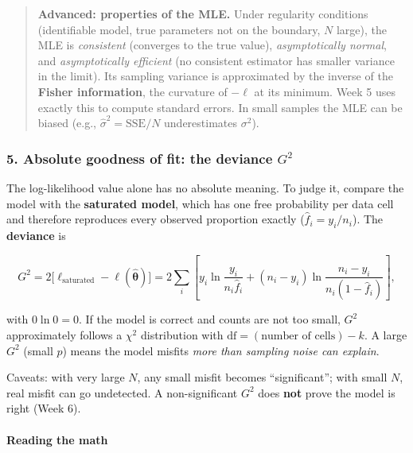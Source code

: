 \begin{quote}
\textbf{Advanced: properties of the MLE.} Under regularity conditions
(identifiable model, true parameters not on the boundary, \(N\) large),
the MLE is \emph{consistent} (converges to the true value),
\emph{asymptotically normal}, and \emph{asymptotically efficient} (no
consistent estimator has smaller variance in the limit). Its sampling
variance is approximated by the inverse of the \textbf{Fisher
information}, the curvature of \(-\ell\) at its minimum. Week 5 uses
exactly this to compute standard errors. In small samples the MLE can be
biased (e.g., \(\hat\sigma^2 = \mathrm{SSE}/N\) underestimates
\(\sigma^2\)).
\end{quote}

\subsubsection{\texorpdfstring{5. Absolute goodness of fit: the deviance
\(G^2\)}{5. Absolute goodness of fit: the deviance G\^{}2}}

The log-likelihood value alone has no absolute meaning. To judge it,
compare the model with the \textbf{saturated model}, which has one free
probability per data cell and therefore reproduces every observed
proportion exactly (\(\hat f_i = y_i/n_i\)). The \textbf{deviance} is

\[
G^2 = 2\big[\ell_{\text{saturated}} - \ell(\hat{\boldsymbol\theta})\big]
= 2\sum_i \left[y_i \ln\frac{y_i}{n_i \hat f_i} + (n_i - y_i)\ln\frac{n_i - y_i}{n_i(1-\hat f_i)}\right],
\]

with \(0 \ln 0 = 0\). If the model is correct and counts are not too
small, \(G^2\) approximately follows a \(\chi^2\) distribution with
\(\text{df} = (\text{number of cells}) - k\). A large \(G^2\) (small
\(p\)) means the model misfits \emph{more than sampling noise can
explain}.

Caveats: with very large \(N\), any small misfit becomes
``significant''; with small \(N\), real misfit can go undetected. A
non-significant \(G^2\) does \textbf{not} prove the model is right (Week
6).

\paragraph{Reading the math}

